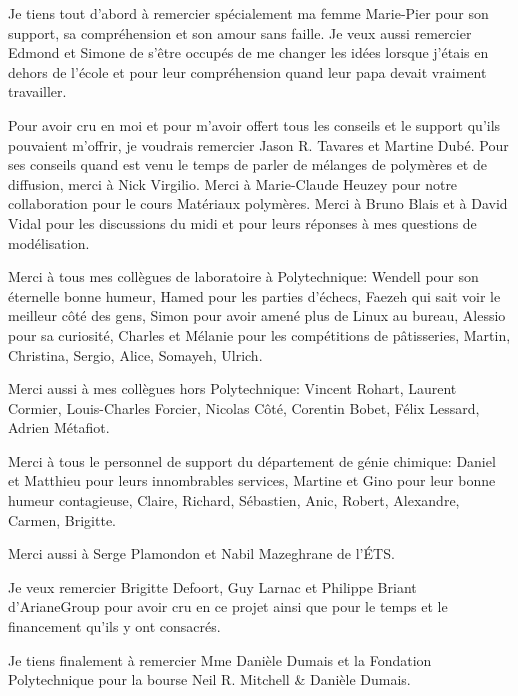 %
%
Je tiens tout d'abord à remercier spécialement ma femme Marie-Pier pour son support, sa compréhension et son amour sans faille. 
Je veux aussi remercier Edmond et Simone de s'être occupés de me changer les idées lorsque j'étais en dehors de l'école et pour leur compréhension quand leur papa devait vraiment travailler. 

Pour avoir cru en moi et pour m'avoir offert tous les conseils et le support qu'ils pouvaient m'offrir, je voudrais remercier Jason R. Tavares et Martine Dubé. 
Pour ses conseils quand est venu le temps de parler de mélanges de polymères et de diffusion, merci à Nick Virgilio. 
Merci à Marie-Claude Heuzey pour notre collaboration pour le cours Matériaux polymères. 
Merci à Bruno Blais et à David Vidal pour les discussions du midi et pour leurs réponses à mes questions de modélisation. 

Merci à tous mes collègues de laboratoire à Polytechnique: Wendell pour son éternelle bonne humeur, Hamed pour les parties d'échecs, Faezeh qui sait voir le meilleur côté des gens, Simon pour avoir amené plus de Linux au bureau, Alessio pour sa curiosité, Charles et Mélanie pour les compétitions de pâtisseries, Martin, Christina, Sergio, Alice, Somayeh, Ulrich.

Merci aussi à mes collègues hors Polytechnique: Vincent Rohart, Laurent Cormier, Louis-Charles Forcier, Nicolas Côté, Corentin Bobet, Félix Lessard, Adrien Métafiot. 

Merci à tous le personnel de support du département de génie chimique: Daniel et Matthieu pour leurs innombrables services, Martine et Gino pour leur bonne humeur contagieuse, Claire, Richard, Sébastien, Anic, Robert, Alexandre, Carmen, Brigitte. 

Merci aussi à Serge Plamondon et Nabil Mazeghrane de l'ÉTS. 

Je veux remercier Brigitte Defoort, Guy Larnac et Philippe Briant d'ArianeGroup pour avoir cru en ce projet ainsi que pour le temps et le financement qu'ils y ont consacrés. 

Je tiens finalement à remercier Mme Danièle Dumais et la Fondation Polytechnique pour la bourse Neil R. Mitchell \& Danièle Dumais. 
